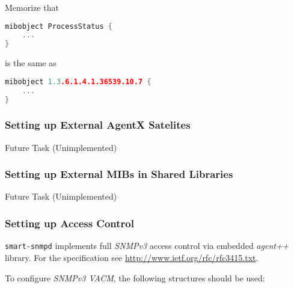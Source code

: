 \begin{minipage}{\textwidth}
Memorize that
\begin{lstlisting}[language=C++,inputencoding=latin9,frame=shadowbox]
mibobject ProcessStatus {
    ...
}
\end{lstlisting}

is the same as

\begin{lstlisting}[language=C++,inputencoding=latin9,frame=shadowbox]
mibobject 1.3.6.1.4.1.36539.10.7 {
    ...
}
\end{lstlisting}
\end{minipage}

\subsubsection{Setting up External AgentX Satelites}

Future Task (Unimplemented)

\subsubsection{Setting up External MIBs in Shared Libraries}

Future Task (Unimplemented)

\subsubsection{Setting up Access Control}

\texttt{smart-snmpd} implements full \emph{SNMPv3} access control via embedded
\emph{agent++} library. For the specification see \url{http://www.ietf.org/rfc/rfc3415.txt}.


To configure \emph{SNMPv3 VACM}, the following structures should be used:

